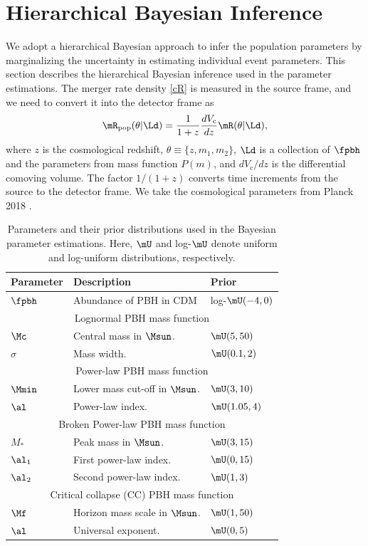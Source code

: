 \documentclass[
reprint,           %
superscriptaddress,%
amsmath,           %
amssymb,           %
aps,               %
prd,               %
notitlepage,       %
longbibliography,  %
floatfix,          %
nofootinbib,
]{revtex4-1}
\def\[{\left[}
\def\e{\begin{equation}}
\def\q{\end{equation}}
\begin{document}
\section{\label{method}Hierarchical Bayesian Inference}
We adopt a hierarchical Bayesian approach to infer the population parameters by marginalizing the uncertainty in estimating individual event parameters.
This section describes the hierarchical Bayesian inference used in the parameter estimations.
The merger rate density \eqref{cR} is measured in the source frame, and we need to convert it into the detector frame as
\e\label{Rpop}
\mR_{\mathrm{pop}}(\theta|\Ld) = \frac{1}{1+z} \frac{dV_\mathrm{c}}{dz} \mR(\theta|\Ld),
\q
where $z$ is the cosmological redshift, $\theta\equiv\{z, m_1, m_2\}$, $\Ld$ is a collection of $\fpbh$ and the parameters from mass function $P(m)$, and $dV_\mathrm{c}/dz$ is the differential comoving volume. The factor $1/(1 + z)$ converts time increments from the source to the detector frame. We take the cosmological parameters from Planck 2018 \cite{Planck:2018vyg}.

\begin{table}[tbp!]
	\centering
	\begin{tabular}{lll}
		\hline\hline
		\textbf{Parameter\quad} & \textbf{Description} & \textbf{Prior} \\
		\hline
		$\fpbh$ & Abundance of PBH in CDM & log-$\mU(-4, 0)$\\
		\hline
		\multicolumn{3}{c}{Lognormal PBH mass function} \\[1pt]
		$\Mc$ & Central mass in $\Msun$. & $\mU(5, 50)$\\
		$\sigma$ & Mass width. & $\mU(0.1, 2)$\\
		\hline
		\multicolumn{3}{c}{Power-law PBH mass function} \\[1pt]
		$\Mmin$ & Lower mass cut-off in $\Msun$. & $\mU(3, 10)$\\
		$\al$ & Power-law index. & $\mU(1.05, 4)$\\
		\hline
		\multicolumn{3}{c}{Broken Power-law PBH mass function} \\[1pt]
		$M_*$ & Peak mass in $\Msun$. & $\mU(3, 15)$\\
		$\al_1$ & First power-law index. & $\mU(0, 15)$\\
		$\al_2$ & Second power-law index. & $\mU(1, 3)$\\
		\hline
		\multicolumn{3}{c}{Critical collapse (CC) PBH mass function} \\[1pt]
		$\Mf$ & Horizon mass scale in $\Msun$. & $\mU(1, 50)$\\
		$\al$ & Universal exponent. & $\mU(0, 5)$\\
		\hline
	\end{tabular}	
	\caption{\label{table:priors}Parameters and their prior distributions used in the Bayesian parameter estimations. Here, $\mU$ and log-$\mU$ denote uniform and log-uniform distributions, respectively.}
\end{table}
\end{document}
